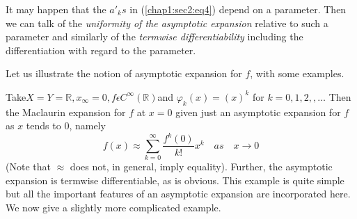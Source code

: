 \begin{remarks*}
  It may happen that the $a'_{k} s$ in (\ref{chap1:sec2:eq4}) depend on a
  parameter. Then we can talk of the {\em uniformity of the asymptotic
  expansion } relative to such a parameter and similarly of the
  {\em termwise differentiability} including the differentiation
  with regard to the parameter. 
\end{remarks*}

Let  us illustrate the notion of
  asymptotic expansion for $f$, with some examples.

\begin{example} \label{chap1:sec2:exp1} %
  Take\pageoriginale $X=Y=\mathbb{R}, x_{\infty}=0,f\epsilon
  C^{\infty}(\mathbb{R})$and $\varphi_{k}(x)=(x)^{k}$ for
  $k=0,1,2,,\ldots$ Then the Maclaurin expansion for $f$ at $x=0$ given
  just an asymptotic expansion for $f$ as $x$ tends to $0$, namely
  \begin{equation*}
    f(x)\approx\sum_{k=0}^{\infty}\frac{f^{k}(0)}{k!}x^{k}\quad as \quad
    x\rightarrow 0
  \end{equation*}
  (Note that $\approx$ does not, in general, imply equality). Further,
  the asymptotic expansion is termwise differentiable, as is
  obvious. This example is quite simple but all the important features
  of an asymptotic expansion are incorporated here. We now give a
  slightly more complicated example.
\end{example}

